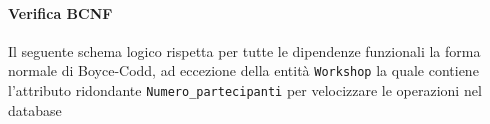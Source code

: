 \paragraph{Verifica BCNF} Il seguente schema logico rispetta per tutte le dipendenze funzionali la forma normale di Boyce-Codd, ad eccezione della entità \texttt{Workshop} la quale contiene l'attributo ridondante \texttt{Numero\_partecipanti} per velocizzare le operazioni nel database

